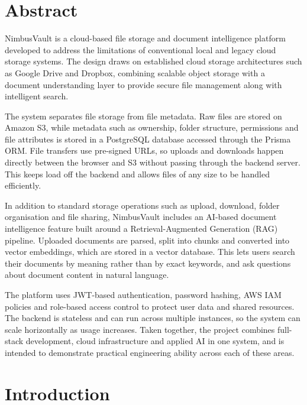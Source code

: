 \documentclass[11pt,a4paper]{article}
\begin{document}
\pagestyle{plain}
\tableofcontents
\newpage
\pagestyle{fancy}
\setcounter{page}{1}


\section*{Abstract}

NimbusVault is a cloud-based file storage and document intelligence platform developed to address the limitations of conventional local and legacy cloud storage systems. The design draws on established cloud storage architectures such as Google Drive and Dropbox, combining scalable object storage with a document understanding layer to provide secure file management along with intelligent search.

The system separates file storage from file metadata. Raw files are stored on Amazon S3, while metadata such as ownership, folder structure, permissions and file attributes is stored in a PostgreSQL database accessed through the Prisma ORM. File transfers use pre-signed URLs, so uploads and downloads happen directly between the browser and S3 without passing through the backend server. This keeps load off the backend and allows files of any size to be handled efficiently.

In addition to standard storage operations such as upload, download, folder organisation and file sharing, NimbusVault includes an AI-based document intelligence feature built around a Retrieval-Augmented Generation (RAG) pipeline. Uploaded documents are parsed, split into chunks and converted into vector embeddings, which are stored in a vector database. This lets users search their documents by meaning rather than by exact keywords, and ask questions about document content in natural language.

The platform uses JWT-based authentication, password hashing, AWS IAM policies and role-based access control to protect user data and shared resources. The backend is stateless and can run across multiple instances, so the system can scale horizontally as usage increases. Taken together, the project combines full-stack development, cloud infrastructure and applied AI in one system, and is intended to demonstrate practical engineering ability across each of these areas.

\newpage

\section{Introduction}
\end{document}
